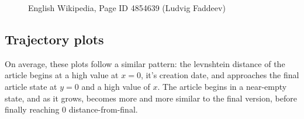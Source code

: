 \begin{figure}
  \caption{English Wikipedia, Page ID 4854639 (Ludvig Faddeev)}
  \label{fig:one-weight}
\end{figure}

\subsection*{Trajectory plots}
On average, these plots follow a similar pattern: the levnshtein
distance of the article begins at a high value at $x=0$, it's creation
date, and approaches the final article state at $y=0$ and a high value
of $x$. The article begins in a near-empty state, and as it grows,
becomes more and more similar to the final version, before finally
reaching $0$ distance-from-final. 


